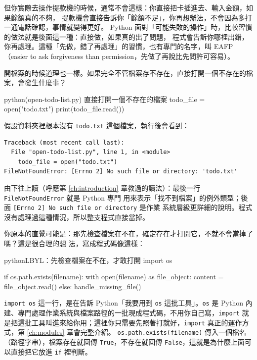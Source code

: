 但你實際去操作提款機的時候，通常不會這樣：你直接把卡插進去、輸入金額，如果餘額真的不夠，
提款機會直接告訴你「餘額不足」，你再想辦法，不會因為多打一通電話確認，事情就變得更好。
Python 面對「可能失敗的操作」時，比較習慣的做法就是後面這一種：直接做，如果真的出了問題，
程式會告訴你哪裡出錯，你再處理。這種「先做，錯了再處理」的習慣，也有專門的名字，叫 EAFP
（easier to ask forgiveness than permission，先做了再說比先問許可容易）。

開檔案的時候道理也一樣。如果完全不管檔案存不存在，直接打開一個不存在的檔案，會發生什麼事？

\begin{example}{python}{(open-todo-list.py) 直接打開一個不存在的檔案}
todo_file = open("todo.txt")
print(todo_file.read())
\end{example}

假設資料夾裡根本沒有 \texttt{todo.txt} 這個檔案，執行後會看到：

\begin{verbatim}
Traceback (most recent call last):
  File "open-todo-list.py", line 1, in <module>
    todo_file = open("todo.txt")
FileNotFoundError: [Errno 2] No such file or directory: 'todo.txt'
\end{verbatim}

由下往上讀（呼應第 \ref{ch:introduction} 章教過的讀法）：最後一行 \texttt{FileNotFoundError} 就是 Python 專門
用來表示「找不到檔案」的例外類型；後面 \texttt{[Errno 2] No such file or directory} 是作業
系統層級更詳細的說明。程式沒有處理過這種情況，所以整支程式直接當掉。

你原本的直覺可能是：那先檢查檔案在不在，確定存在才打開它，不就不會當掉了嗎？這是很合理的想
法，寫成程式碼像這樣：

\begin{code}{python}{LBYL：先檢查檔案在不在，才敢打開}
import os

if os.path.exists(filename):
    with open(filename) as file_object:
        content = file_object.read()
else:
    handle_missing_file()
\end{code}

\texttt{import os} 這一行，是在告訴 Python「我要用到 \texttt{os} 這批工具」。\texttt{os}
是 Python 內建、專門處理作業系統與檔案路徑的一批現成程式碼，不用你自己寫，\texttt{import}
就是把這批工具叫進來給你用；這裡你只需要先照著打就好，\texttt{import} 真正的運作方式，第
\ref{ch:modules} 章會完整介紹。
\texttt{os.path.exists(filename)} 傳入一個檔名（路徑字串），檔案存在就回傳
\texttt{True}，不存在就回傳 \texttt{False}，這就是為什麼上面可以直接把它放進 \texttt{if}
裡判斷。

